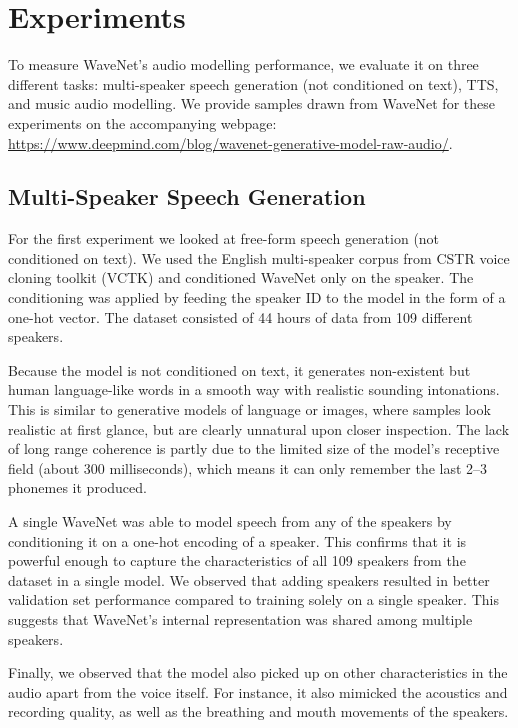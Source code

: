 \documentclass{article}
\begin{document}
\section{Experiments}

To measure WaveNet's audio modelling performance, we evaluate it on three different tasks: multi-speaker speech generation (not conditioned on text), TTS, and music audio modelling. We provide samples drawn from WaveNet for these experiments on the accompanying webpage:\\ \url{https://www.deepmind.com/blog/wavenet-generative-model-raw-audio/}.

\subsection{Multi-Speaker Speech Generation}

For the first experiment we looked at free-form speech generation (not conditioned on text). We used the English multi-speaker corpus from CSTR voice cloning toolkit (VCTK) \citep{VCTK} and conditioned WaveNet only on the speaker. The conditioning was applied by feeding the speaker ID to the model in the form of a one-hot vector. The dataset consisted of 44 hours of data from 109 different speakers.

Because the model is not conditioned on text, it generates non-existent but human language-like words in a smooth way with realistic sounding intonations. This is similar to generative models of language or images, where samples look realistic at first glance, but are clearly unnatural upon closer inspection. The lack of long range coherence is partly due to the limited size of the model's receptive field (about 300 milliseconds), which means it can only remember the last 2--3 phonemes it produced.

A single WaveNet was able to model speech from any of the speakers by conditioning it on a one-hot encoding of a speaker. This confirms that it is powerful enough to capture the characteristics of all 109 speakers from the dataset in a single model. We observed that adding speakers resulted in better validation set performance compared to training solely on a single speaker. This suggests that WaveNet's internal representation was shared among multiple speakers.

Finally, we observed that the model also picked up on other characteristics in the audio apart from the voice itself. For instance, it also mimicked the acoustics and recording quality, as well as the breathing and mouth movements of the speakers.
\end{document}
